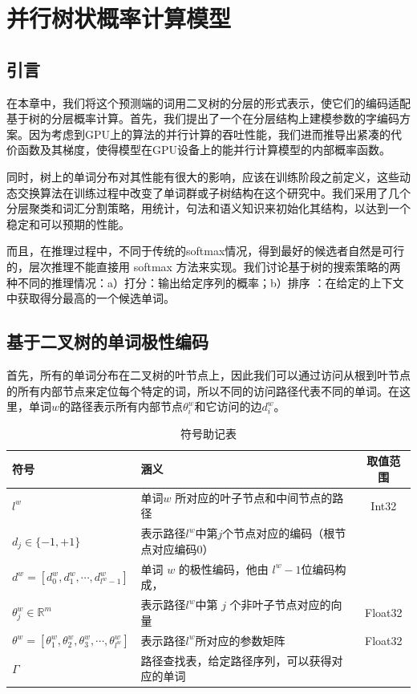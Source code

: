 \chapter{并行树状概率计算模型}
\section{引言}
在本章中，我们将这个预测端的词用二叉树的分层的形式表示，使它们的编码适配基于树的分层概率计算。首先，我们提出了一个在分层结构上建模参数的字编码方案。因为考虑到GPU上的算法的并行计算的吞吐性能，我们进而推导出紧凑的代价函数及其梯度，使得模型在GPU设备上的能并行计算模型的内部概率函数。

同时，树上的单词分布对其性能有很大的影响，应该在训练阶段之前定义，这些动态交换算法在训练过程中改变了单词群或子树结构在这个研究中。我们采用了几个分层聚类和词汇分割策略，用统计，句法和语义知识来初始化其结构，以达到一个稳定和可以预期的性能。

而且，在推理过程中，不同于传统的softmax情况，得到最好的候选者自然是可行的，层次推理不能直接用 softmax 方法来实现。我们讨论基于树的搜索策略的两种不同的推理情况：a）打分：输出给定序列的概率；b）排序   ：在给定的上下文中获取得分最高的一个候选单词。
\section{基于二叉树的单词极性编码}
首先，所有的单词分布在二叉树的叶节点上，因此我们可以通过访问从根到叶节点的所有内部节点来定位每个特定的词，所以不同的访问路径代表不同的单词。在这里，单词$ w $的路径表示所有内部节点$ \theta^w_i $和它访问的边$ d ^ w_i $。

\begin{table}[!ht]
  \centering
  \caption{符号助记表}
\begin{tabular}{llc}
  \toprule
   符号&涵义&取值范围\\ \midrule
$l^w$ &单词$w$ 所对应的叶子节点和中间节点的路径&Int32 \\
$d_j\in \{-1,+1\}$&表示路径$l^w$中第$j$个节点对应的编码（根节点对应编码$0$）&\\
$ d^w=[d_0^w,d_1^w,\cdots,d_{l^w-1}^w] $& 单词 $w$ 的极性编码，他由 $l^w-1$位编码构成，&\\
$\theta_{j}^w\in\mathbb{R}^m$ &表示路径$l^w$中第 $j$ 个非叶子节点对应的向量& Float32\\
$ \theta^w=[\theta_1^w,\theta_2^w,\theta_3^w, \cdots,\theta_{l^w}^w]$&表示路径$l^w$所对应的参数矩阵&Float32 \\
$\Gamma$ &路径查找表，给定路径序列，可以获得对应的单词& \\
  \bottomrule
\end{tabular}
\end{table}

